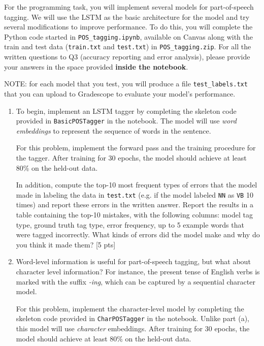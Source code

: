 For the programming task, you will implement several models for part-of-speech tagging.
We will use the LSTM as the basic architecture for the model and try several modifications to improve performance.
To do this, you will complete the Python code started in \texttt{POS\_tagging.ipynb}, available on Canvas along with the train and test data (\texttt{train.txt} and \texttt{test.txt}) in \texttt{POS\_tagging.zip}.
For all the written questions to Q3 (accuracy reporting and error analysis), please provide your answers in the space provided \textbf{inside the notebook}.

NOTE: for each model that you test, you will produce a file \texttt{test\_labels.txt} that you can upload to Gradescope to evaluate your model's performance. 

\begin{enumerate}
    \item 
    To begin, implement an LSTM tagger by completing the skeleton code provided in \texttt{BasicPOSTagger} in the notebook.
    The model will use \emph{word embeddings} to represent the sequence of words in the sentence.
    
    For this problem, implement the forward pass and the training procedure for the tagger.
    After training for 30 epochs, the model should achieve at least 80\% on the held-out data. 
    
    In addition, compute the top-10 most frequent types of errors that the model made in labeling the data in \texttt{test.txt} (e.g. if the model labeled \texttt{NN} as \texttt{VB} 10 times) and report these errors in the written answer.
    Report the results in a table containing the top-10 mistakes, with the following columns: model tag type, ground truth tag type, error frequency, up to 5 example words that were tagged incorrectly.
    What kinds of errors did the model make and why do you think it made them?  [5 pts]
    \item 
    Word-level information is useful for part-of-speech tagging, but what about character level information?
    For instance, the present tense of English verbs is marked with the suffix \emph{-ing}, which can be captured by a sequential character model.
    
    For this problem, implement the character-level model by completing the skeleton code provided in \texttt{CharPOSTagger} in the notebook.
    Unlike part (a), this model will use \emph{character} embeddings.
    After training for 30 epochs, the model should achieve at least 80\%
    on the held-out data.
    

\end{enumerate}

